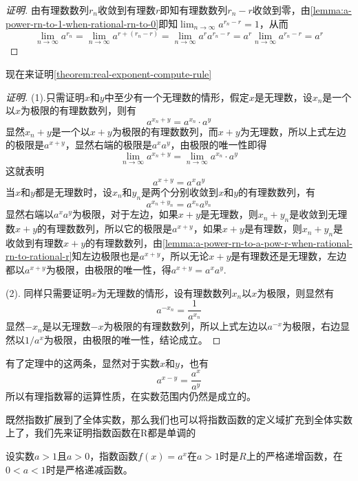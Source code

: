\begin{proof}[证明]
  由有理数数列$r_n$收敛到有理数$r$即知有理数数列$r_n-r$收敛到零，由\autoref{lemma:a-power-rn-to-1-when-rational-rn-to-0}即知$\lim_{n \to \infty}a^{r_n-r} = 1$，从而
  \[ \lim_{n \to \infty} a^{r_n} = \lim_{n \to \infty} a^{r+(r_n-r)} = \lim_{n \to \infty} a^ra^{r_n-r} = a^r \lim_{n \to \infty}a^{r_n-r} = a^r \]
\end{proof}

现在来证明\autoref{theorem:real-exponent-compute-rule}
\begin{proof}[证明]
  (1).只需证明$x$和$y$中至少有一个无理数的情形，假定$x$是无理数，设$x_n$是一个以$x$为极限的有理数数列，则有
  \[ a^{x_n+y} = a^{x_n} \cdot a^y \]
  显然$x_n+y$是一个以$x+y$为极限的有理数数列，而$x+y$为无理数，所以上式左边的极限是$a^{x+y}$，显然右端的极限是$a^xa^y$，由极限的唯一性即得
  \[ \lim_{n \to \infty}a^{x_n+y} = \lim_{n \to \infty}a^{x_n} \cdot a^y \]
  这就表明
  \[ a^{x+y} = a^xa^y \]
  当$x$和$y$都是无理数时，设$x_n$和$y_n$是两个分别收敛到$x$和$y$的有理数数列，有
  \[ a^{x_n+y_n} = a^{x_n}a^{y_n} \]
  显然右端以$a^xa^y$为极限，对于左边，如果$x+y$是无理数，则$x_n+y_n$是收敛到无理数$x+y$的有理数数列，所以它的极限是$a^{x+y}$，如果$x+y$是有理数，则$x_n+y_n$是收敛到有理数$x+y$的有理数数列，由\autoref{lemma:a-power-rn-to-a-pow-r-when-rational-rn-to-rational-r}知左边极限也是$a^{x+y}$，所以无论$x+y$是有理数还是无理数，左边都以$a^{x+y}$为极限，由极限的唯一性，得$a^{x+y}=a^xa^y$.

  (2). 同样只需要证明$x$为无理数的情形，设有理数数列$x_n$以$x$为极限，则显然有
  \[ a^{-x_n} = \frac{1}{a^{x_n}} \]
  显然$-x_n$是以无理数$-x$为极限的有理数数列，所以上式左边以$a^{-x}$为极限，右边显然以$1/a^x$为极限，由极限的唯一性，结论成立。
\end{proof}

有了定理中的这两条，显然对于实数$x$和$y$，也有
\[ a^{x-y} = \frac{a^x}{a^y} \]
所以有理指数幂的运算性质，在实数范围内仍然是成立的。

既然指数扩展到了全体实数，那么我们也可以将指数函数的定义域扩充到全体实数上了，我们先来证明指数函数在R都是单调的

\begin{theorem}
  设实数$a>1$且$a>0$，指数函数$f(x)=a^x$在$a>1$时是$R$上的严格递增函数，在$0<a<1$时是严格递减函数。
\end{theorem}

